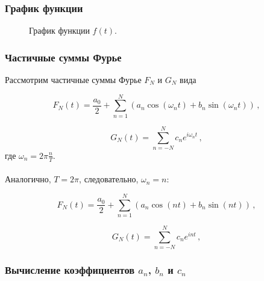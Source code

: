 \documentclass[a5paper, 10pt]{article}
\theoremstyle{definition}
\theoremstyle{plain}
\theoremstyle{remark}
\begin{document}
\subsubsection{График функции}
\begin{figure}[h]
\caption{График функции $f(t)$.}
\end{figure}

\subsubsection{Частичные суммы Фурье}

Рассмотрим частичные суммы Фурье $F_N$ и $G_N$ вида

\begin{equation}
F_N(t) = \frac{a_0}{2} + \sum  \limits_{n=1}^N \left( a_n \cos \left( \omega_n t \right) + b_n \sin \left( \omega_n t \right)  \right) \, ,
\end{equation}

\begin{equation}
G_N (t) = \sum  \limits_{n=-N}^N c_n e^{i \omega_n t} \, ,
\end{equation}
где $\omega_n = 2 \pi \frac{n}{T}$.\\
\\
Аналогично, $T = 2 \pi$, следовательно, $\omega_n = n$:

\begin{equation}
F_N(t) = \frac{a_0}{2} + \sum  \limits_{n=1}^N \left( a_n \cos \left( n t \right) + b_n \sin \left( n t \right)  \right) \, ,
\end{equation}

\begin{equation}
G_N (t) = \sum  \limits_{n=-N}^N c_n e^{i n t} \, ,
\end{equation}


\subsubsection{Вычисление коэффициентов $a_n$, $b_n$ и $c_n$}
\end{document}
